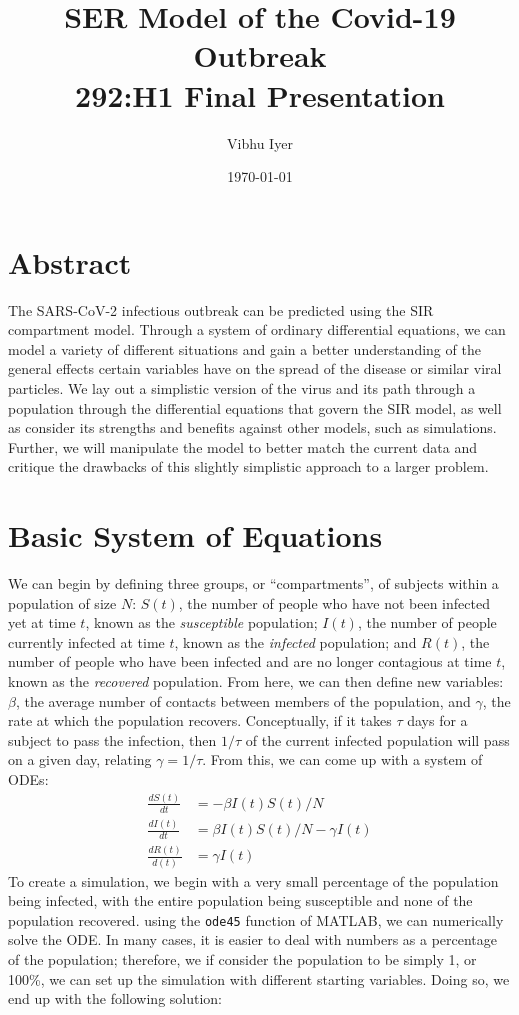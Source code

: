 \documentclass{article}
\title{SER Model of the Covid-19 Outbreak \\\large 292:H1 Final Presentation}
\author{Vibhu Iyer}
\date{\today}
\begin{document}
\maketitle

\graphicspath{{pictures/}}


{
 \centering
 \section*{Abstract}
 The SARS-CoV-2 infectious outbreak can be predicted using the SIR compartment model. Through a system of ordinary differential equations, we can model a variety of different situations and gain a better understanding of the general effects certain variables have on the spread of the disease or similar viral particles. We lay out a simplistic version of the virus and its path through a population through the differential equations that govern the SIR model, as well as consider its strengths and benefits against other models, such as simulations. Further, we will manipulate the model to better match the current data and critique the drawbacks of this slightly simplistic approach to a larger problem.
}

\tableofcontents

\section{Basic System of Equations}
We can begin by defining three groups, or ``compartments'', of subjects within a population of size $N$: $S(t)$, the number of people who have not been infected yet at time $t$, known as the \textit{susceptible} population; $I(t)$, the number of people currently infected at time $t$, known as the \textit{infected} population; and $R(t)$, the number of people who have been infected and are no longer contagious at time $t$, known as the \textit{recovered} population. From here, we can then define new variables:
$\beta$, the average number of contacts between members of the population, and $\gamma$, the rate at which the population recovers. Conceptually, if it takes $\tau$ days for a subject to pass the infection, then $1/\tau$ of the current infected population will pass on a given day, relating $\gamma = 1/\tau$. From this, we can come up with a system of ODEs:
\begin{align*}
 \frac{dS(t)}{dt}   & = -\beta I(t)S(t)/N              \\
 \frac{dI(t)}{dt}   & = \beta I(t)S(t)/N - \gamma I(t) \\
 \frac{dR(t)}{d(t)} & = \gamma I(t)
\end{align*}
To create a simulation, we begin with a very small percentage of the population being infected, with the entire population being susceptible and none of the population recovered. using the \texttt{ode45} function of MATLAB, we can numerically solve the ODE. In many cases, it is easier to deal with numbers as a percentage of the population; therefore, we if consider the population to be simply 1, or 100\%, we can set up the simulation with different starting variables. Doing so, we end up with the following solution:
\end{document}
